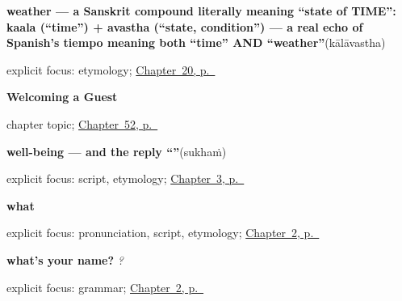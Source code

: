 \noindent\begin{minipage}[t]{\linewidth}
\raggedright
\textbf{weather — a Sanskrit compound literally meaning \textquotedblleft{}state of TIME\textquotedblright{}: kaala (\textquotedblleft{}time\textquotedblright{}) + avastha (\textquotedblleft{}state, condition\textquotedblright{}) — a real echo of Spanish's tiempo meaning both \textquotedblleft{}time\textquotedblright{} AND \textquotedblleft{}weather\textquotedblright{}}\enspace\emph{}\enspace(kālāvastha)\par
\footnotesize explicit focus: etymology; \hyperref[ch:ml-numbers-and-weather]{Chapter~20, p.~\pageref*{ch:ml-numbers-and-weather}}
\end{minipage}\par\smallskip

\noindent\begin{minipage}[t]{\linewidth}
\raggedright
\textbf{Welcoming a Guest}\par
\footnotesize chapter topic; \hyperref[ch:ml-welcoming-a-guest]{Chapter~52, p.~\pageref*{ch:ml-welcoming-a-guest}}
\end{minipage}\par\smallskip

\noindent\begin{minipage}[t]{\linewidth}
\raggedright
\textbf{well-being — and the reply \textquotedblleft{}\textquotedblright{}}\enspace\emph{}\enspace(sukhaṁ)\par
\footnotesize explicit focus: script, etymology; \hyperref[ch:responding]{Chapter~3, p.~\pageref*{ch:responding}}
\end{minipage}\par\smallskip

\noindent\begin{minipage}[t]{\linewidth}
\raggedright
\textbf{what}\enspace\emph{}\par
\footnotesize explicit focus: pronunciation, script, etymology; \hyperref[ch:introductions]{Chapter~2, p.~\pageref*{ch:introductions}}
\end{minipage}\par\smallskip

\noindent\begin{minipage}[t]{\linewidth}
\raggedright
\textbf{what's your name?}\enspace\emph{  ?}\par
\footnotesize explicit focus: grammar; \hyperref[ch:introductions]{Chapter~2, p.~\pageref*{ch:introductions}}
\end{minipage}\par\smallskip

